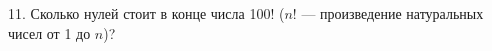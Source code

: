 11. Сколько нулей стоит в конце числа 100! ($n!$ --- произведение натуральных чисел от 1 до $n$)?\\
